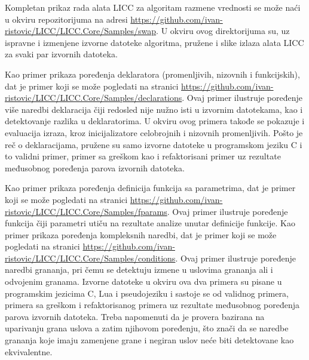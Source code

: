 
Kompletan prikaz rada alata LICC za algoritam razmene vrednosti se može naći u okviru repozitorijuma na adresi \url{https://github.com/ivan-ristovic/LICC/LICC.Core/Samples/swap}. U okviru ovog direktorijuma su, uz ispravne i izmenjene izvorne datoteke algoritma, pružene i slike izlaza alata LICC za svaki par izvornih datoteka.

Kao primer prikaza poređenja deklaratora (promenljivih, nizovnih i funkcijskih), dat je primer koji se može pogledati na stranici \url{https://github.com/ivan-ristovic/LICC/LICC.Core/Samples/declarations}. Ovaj primer ilustruje poređenje više naredbi deklaracija čiji redosled nije nužno isti u izvornim datotekama, kao i detektovanje razlika u deklaratorima. U okviru ovog primera takođe se pokazuje i evaluacija izraza, kroz inicijalizatore celobrojnih i nizovnih promenljivih. Pošto je reč o deklaracijama, pružene su samo izvorne datoteke u programskom jeziku C i to validni primer, primer sa greškom kao i refaktorisani primer uz rezultate međusobnog poređenja parova izvornih datoteka.

Kao primer prikaza poređenja definicija funkcija sa parametrima, dat je primer koji se može pogledati na stranici \url{https://github.com/ivan-ristovic/LICC/LICC.Core/Samples/fparams}. Ovaj primer ilustruje poređenje funkcija čiji parametri utiču na rezultate analize unutar definicije funkcije. Kao primer prikaza poređenja kompleksnih naredbi, dat je primer koji se može pogledati na stranici \url{https://github.com/ivan-ristovic/LICC/LICC.Core/Samples/conditions}. Ovaj primer ilustruje poređenje naredbi grananja, pri čemu se detektuju izmene u uslovima grananja ali i odvojenim granama. Izvorne datoteke u okviru ova dva primera su pisane u programskim jezicima C, Lua i pseudojeziku i sastoje se od validnog primera, primera sa greškom i refaktorisanog primera uz rezultate međusobnog poređenja parova izvornih datoteka. Treba napomenuti da je provera bazirana na uparivanju grana uslova a zatim njihovom poređenju, što znači da se naredbe grananja koje imaju zamenjene grane i negiran uslov neće biti detektovane kao ekvivalentne.
